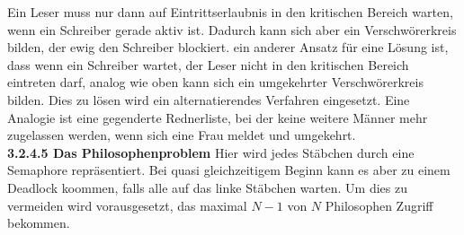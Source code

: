 \documentclass{article}
\begin{document}
    Ein Leser muss nur dann auf Eintrittserlaubnis in den kritischen Bereich warten, wenn ein Schreiber gerade aktiv ist. Dadurch kann sich aber ein Verschwörerkreis bilden, der ewig den Schreiber blockiert.\newline
    ein anderer Ansatz für eine Lösung ist, dass wenn ein Schreiber wartet, der Leser nicht in den kritischen Bereich eintreten darf, analog wie oben kann sich ein umgekehrter Verschwörerkreis bilden.\newline
    Dies zu lösen wird ein alternatierendes Verfahren eingesetzt. Eine Analogie ist eine gegenderte Rednerliste, bei der keine weitere Männer mehr zugelassen werden, wenn sich eine Frau meldet und umgekehrt.\newline
    \\
    \textbf{3.2.4.5 Das Philosophenproblem}\newline
    Hier wird jedes Stäbchen durch eine Semaphore repräsentiert. Bei quasi gleichzeitigem Beginn kann es aber zu einem Deadlock koommen, falls alle auf das linke Stäbchen warten. Um dies zu vermeiden wird vorausgesetzt, das maximal $N-1$ von $N$ Philosophen Zugriff bekommen. 
\end{document}
